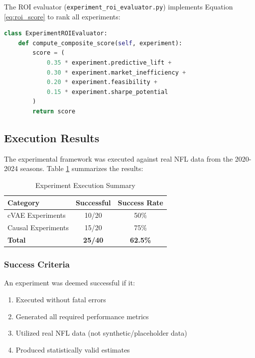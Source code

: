The ROI evaluator (\texttt{experiment\_roi\_evaluator.py}) implements Equation \ref{eq:roi_score} to rank all experiments:

\begin{lstlisting}[language=Python, caption={ROI Scoring Implementation}]
class ExperimentROIEvaluator:
    def compute_composite_score(self, experiment):
        score = (
            0.35 * experiment.predictive_lift +
            0.30 * experiment.market_inefficiency +
            0.20 * experiment.feasibility +
            0.15 * experiment.sharpe_potential
        )
        return score
\end{lstlisting}

\subsection{Execution Results}

The experimental framework was executed against real NFL data from the 2020-2024 seasons. Table \ref{tab:execution_summary} summarizes the results:

\begin{table}[htbp]
\centering
\caption{Experiment Execution Summary}
\label{tab:execution_summary}
\begin{tabular}{lcc}
\toprule
\textbf{Category} & \textbf{Successful} & \textbf{Success Rate} \\
\midrule
cVAE Experiments & 10/20 & 50\% \\
Causal Experiments & 15/20 & 75\% \\
\midrule
\textbf{Total} & \textbf{25/40} & \textbf{62.5\%} \\
\bottomrule
\end{tabular}
\end{table}

\subsubsection{Success Criteria}

An experiment was deemed successful if it:
\begin{enumerate}
    \item Executed without fatal errors
    \item Generated all required performance metrics
    \item Utilized real NFL data (not synthetic/placeholder data)
    \item Produced statistically valid estimates
\end{enumerate}

